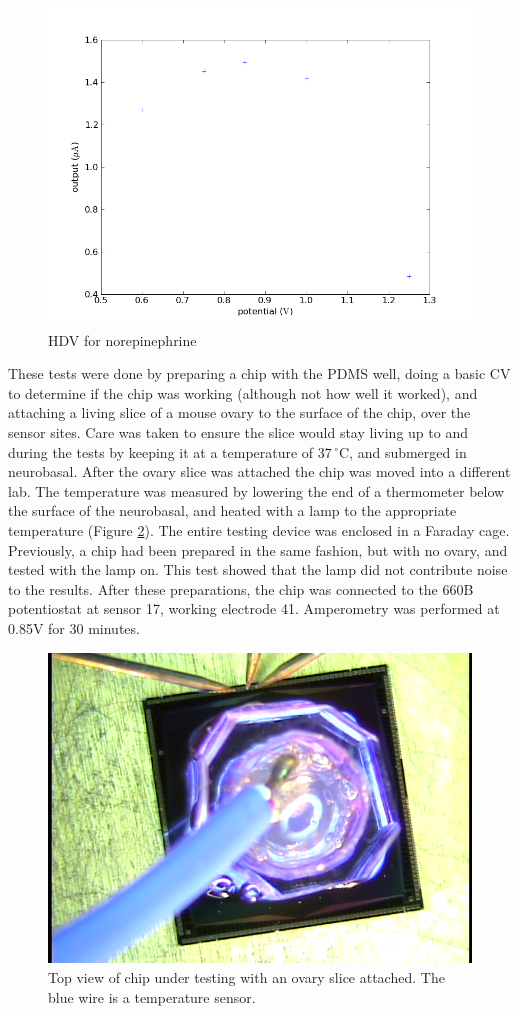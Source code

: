 \begin{figure}
	\centering
	\includegraphics[width=0.7\linewidth]{figures/hdv.png}
	\caption{HDV for norepinephrine}
	\label{hdv}
\end{figure}

These tests were done by preparing a chip with the PDMS well, doing a basic CV to determine if the chip was working (although not how well it worked), and attaching a living slice of a mouse ovary to the surface of the chip, over the sensor sites. Care was taken to ensure the slice would stay living up to and during the tests by keeping it at a temperature of $37\,^{\circ}\mathrm{C}$, and submerged in neurobasal. After the ovary slice was attached the chip was moved into a different lab. The temperature was measured by lowering the end of a thermometer below the surface of the neurobasal, and heated with a lamp to the appropriate temperature (Figure \ref{slice-top}). The entire testing device was enclosed in a Faraday cage. Previously, a chip had been prepared in the same fashion, but with no ovary, and tested with the lamp on. This test showed that the lamp did not contribute noise to the results. After these preparations, the chip was connected to the 660B potentiostat at sensor 17, working electrode 41. Amperometry was performed at 0.85V for 30 minutes.

\begin{figure}
	\centering
	\includegraphics[width=0.5\linewidth]{figures/slice-top.png}
	\caption[Top view of chip under testing with an ovary slice attached]{Top view of chip under testing with an ovary slice attached. The blue wire is a temperature sensor.}
	\label{slice-top}
\end{figure}


